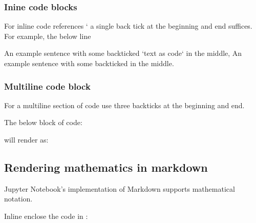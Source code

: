 \documentclass[letterpaper,10pt,english]{jupyterBook}
\begin{document}
\subsubsection{Inine code blocks}
\label{\detokenize{content/04_PythonEssentials/Intro_Jupyter_notebook:inine-code-blocks}}
\sphinxAtStartPar
For inline code references ‘ a single back tick at the beginning and end suffices.  For example, the below line

\sphinxAtStartPar
An example sentence with some back\sphinxhyphen{}ticked `text as code` in the middle,  An example sentence with some back\sphinxhyphen{}ticked  in the middle.


\subsubsection{Multiline code block}
\label{\detokenize{content/04_PythonEssentials/Intro_Jupyter_notebook:multiline-code-block}}
\sphinxAtStartPar
For a multiline section of code use three backticks at the beginning and end.

\sphinxAtStartPar
The below block of code:

\sphinxAtStartPar
{}

\sphinxAtStartPar
{}

\sphinxAtStartPar
{}

\sphinxAtStartPar
{}

\sphinxAtStartPar
will render as:

\begin{sphinxVerbatim}[commandchars=\\\{\}]
  
      
\end{sphinxVerbatim}


\subsection{Rendering mathematics in markdown}
\label{\detokenize{content/04_PythonEssentials/Intro_Jupyter_notebook:rendering-mathematics-in-markdown}}
\sphinxAtStartPar
Jupyter Notebook’s implementation of Markdown supports  mathematical notation.

\sphinxAtStartPar
Inline enclose the  code in \sphinxcode{\sphinxupquote{\$}}:
\end{document}
